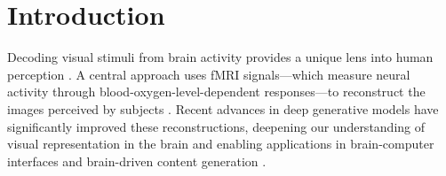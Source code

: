 \vspace{-0.2cm}
\section{Introduction}
\vspace{-0.2cm}


Decoding visual stimuli from brain activity provides a unique lens into human perception \citep{naselaris2011encoding, haufe2014interpretation}. A central approach uses fMRI signals—which measure neural activity through blood-oxygen-level-dependent responses—to reconstruct the images perceived by subjects \citep{allen2022massive, chang2019bold5000, luo2023brainscuba}. Recent advances in deep generative models have significantly improved these reconstructions, deepening our understanding of visual representation in the brain \citep{chen2023seeing} and enabling applications in brain-computer interfaces \citep{sitaram2008fmri} and brain-driven content generation \citep{wang2024braindreamer, qiumindllm}.




